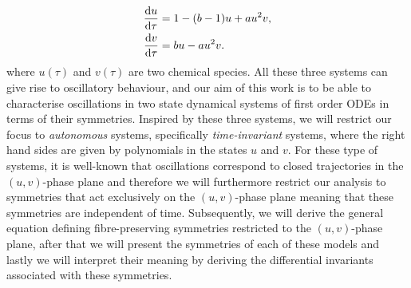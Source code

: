 \begin{equation}
  \begin{split}
    \dv{u}{\tau}&=1-(b-1)u+au^2 v,\\
    \dv{v}{\tau}&=bu-au^2 v.\\
    \end{split}
  \label{eq:Brusselator}
\end{equation}
where $u(\tau)$ and $v(\tau)$ are two chemical species. All these three systems can give rise to oscillatory behaviour, and our aim of this work is to be able to characterise oscillations in two state dynamical systems of first order ODEs in terms of their symmetries. Inspired by these three systems, we will restrict our focus to \textit{autonomous} systems, specifically \textit{time-invariant} systems, where the right hand sides are given by polynomials in the states $u$ and $v$. For these type of systems, it is well-known that oscillations correspond to closed trajectories in the $(u,v)$-phase plane and therefore we will furthermore restrict our analysis to symmetries that act exclusively on the $(u,v)$-phase plane meaning that these symmetries are independent of time. Subsequently, we will derive the general equation defining fibre-preserving symmetries restricted to the $(u,v)$-phase plane, after that we will present the symmetries of each of these models and lastly we will interpret their meaning by deriving the differential invariants associated with these symmetries. 


